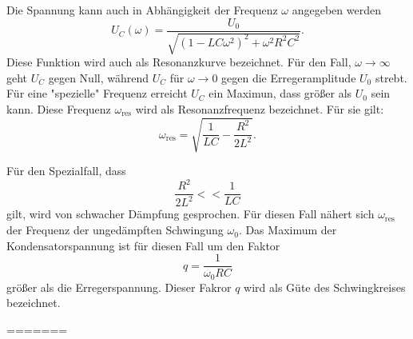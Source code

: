 Die Spannung kann auch in Abhängigkeit der Frequenz $\omega$ angegeben werden
\begin{equation}
  U_{C}(\omega)=\frac{U_{0}}{\sqrt{(1-LC\omega^2)^2+\omega^2R^2C^2}}.
\end{equation}
Diese Funktion wird auch als Resonanzkurve bezeichnet. Für den Fall,
$\omega \to \infty$ geht $U_{C}$ gegen Null, während $U_{C}$ für
$\omega \to 0$ gegen die Erregeramplitude $U_{0}$ strebt.
Für eine "spezielle" Frequenz erreicht $U_{C}$ ein Maximun, dass größer
als $U_{0}$ sein kann. Diese Frequenz $\omega_{\text{res}}$ wird als Resonanzfrequenz
bezeichnet. Für sie gilt:
\begin{equation}
  \omega_{\text{res}}=\sqrt{\frac{1}{LC}-\frac{R^2}{2L^2}}.
\end{equation}

Für den Spezialfall, dass
\begin{equation}
  \frac{R^2}{2L^2}<<\frac{1}{LC}
\end{equation}
gilt, wird von schwacher Dämpfung gesprochen. Für diesen Fall nähert sich
$\omega_{\text{res}}$ der Frequenz der ungedämpften Schwingung $\omega_{0}$.
Das Maximum der Kondensatorspannung ist für diesen Fall um den Faktor
\begin{equation}
  q=\frac{1}{\omega_{0}RC}
  \label{eqn:gute}
\end{equation}
größer als die Erregerspannung. Dieser Fakror $q$ wird als Güte des Schwingkreises
bezeichnet.



\label{sec:Theorie}

=======
